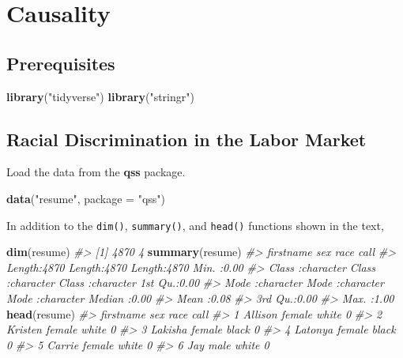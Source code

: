 \documentclass[]{book}
\newenvironment{Shaded}{\begin{snugshade}}{\end{snugshade}}
\newcommand{\CommentTok}[1]{\textcolor[rgb]{0.56,0.35,0.01}{\textit{#1}}}
\newcommand{\DataTypeTok}[1]{\textcolor[rgb]{0.13,0.29,0.53}{#1}}
\newcommand{\KeywordTok}[1]{\textcolor[rgb]{0.13,0.29,0.53}{\textbf{#1}}}
\newcommand{\NormalTok}[1]{#1}
\newcommand{\StringTok}[1]{\textcolor[rgb]{0.31,0.60,0.02}{#1}}
\theoremstyle{definition}
\theoremstyle{definition}
\theoremstyle{definition}
\theoremstyle{remark}
\begin{document}
\hypertarget{causality}{%
\chapter{Causality}\label{causality}}

\hypertarget{prerequisites-1}{%
\section*{Prerequisites}\label{prerequisites-1}}

\begin{Shaded}
\begin{Highlighting}[]
\KeywordTok{library}\NormalTok{(}\StringTok{"tidyverse"}\NormalTok{)}
\KeywordTok{library}\NormalTok{(}\StringTok{"stringr"}\NormalTok{)}
\end{Highlighting}
\end{Shaded}

\hypertarget{racial-discrimination-in-the-labor-market}{%
\section{Racial Discrimination in the Labor
Market}\label{racial-discrimination-in-the-labor-market}}

Load the data from the \textbf{qss} package.

\begin{Shaded}
\begin{Highlighting}[]
\KeywordTok{data}\NormalTok{(}\StringTok{"resume"}\NormalTok{, }\DataTypeTok{package =} \StringTok{"qss"}\NormalTok{)}
\end{Highlighting}
\end{Shaded}

In addition to the \texttt{dim()}, \texttt{summary()}, and
\texttt{head()} functions shown in the text,

\begin{Shaded}
\begin{Highlighting}[]
\KeywordTok{dim}\NormalTok{(resume)}
\CommentTok{#> [1] 4870    4}
\KeywordTok{summary}\NormalTok{(resume)}
\CommentTok{#>   firstname             sex                race                call     }
\CommentTok{#>  Length:4870        Length:4870        Length:4870        Min.   :0.00  }
\CommentTok{#>  Class :character   Class :character   Class :character   1st Qu.:0.00  }
\CommentTok{#>  Mode  :character   Mode  :character   Mode  :character   Median :0.00  }
\CommentTok{#>                                                           Mean   :0.08  }
\CommentTok{#>                                                           3rd Qu.:0.00  }
\CommentTok{#>                                                           Max.   :1.00}
\KeywordTok{head}\NormalTok{(resume)}
\CommentTok{#>   firstname    sex  race call}
\CommentTok{#> 1   Allison female white    0}
\CommentTok{#> 2   Kristen female white    0}
\CommentTok{#> 3   Lakisha female black    0}
\CommentTok{#> 4   Latonya female black    0}
\CommentTok{#> 5    Carrie female white    0}
\CommentTok{#> 6       Jay   male white    0}
\end{Highlighting}
\end{Shaded}
\end{document}
